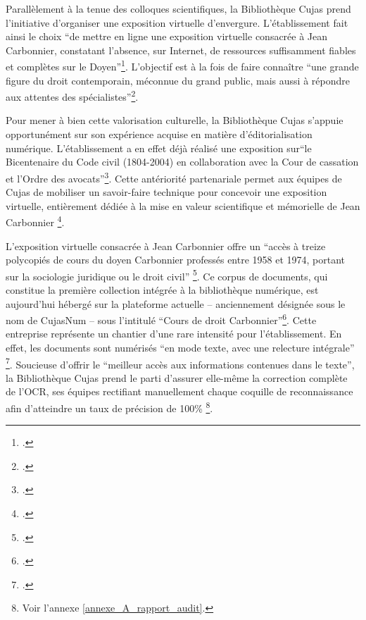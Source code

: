 Parallèlement à la tenue des colloques scientifiques, la Bibliothèque Cujas prend l'initiative d'organiser une exposition virtuelle d'envergure. L'établissement fait ainsi le choix \enquote{de mettre en ligne une exposition virtuelle consacrée à Jean Carbonnier, constatant l'absence, sur Internet, de ressources suffisamment fiables et complètes sur le Doyen}\footcite{balley4ExempleMediation2012}. L'objectif est à la fois de faire connaître \enquote{une grande figure du droit contemporain, méconnue du grand public, mais aussi à répondre aux attentes des spécialistes}\footcite{balley4ExempleMediation2012}. 

Pour mener à bien cette valorisation culturelle, la Bibliothèque Cujas s'appuie opportunément sur son expérience acquise en matière d'éditorialisation numérique. L'établissement a en effet déjà réalisé une exposition sur\enquote{le Bicentenaire du Code civil (1804-2004) en collaboration avec la Cour de cassation et l'Ordre des avocats}\footcite{balley4ExempleMediation2012}. Cette antériorité partenariale permet aux équipes de Cujas de mobiliser un savoir-faire technique pour concevoir une exposition virtuelle, entièrement dédiée à la mise en valeur scientifique et mémorielle de Jean Carbonnier \footcite{2007RefonteProgramme}.

L'exposition virtuelle consacrée à Jean Carbonnier offre un \enquote{accès à treize polycopiés de cours du doyen Carbonnier professés entre 1958 et 1974, portant sur la sociologie juridique ou le droit civil} \footcite{balley4ExempleMediation2012}. Ce corpus de documents, qui constitue la première collection intégrée à la bibliothèque numérique, est aujourd'hui hébergé sur la plateforme actuelle -- anciennement désignée sous le nom de CujasNum -- sous l'intitulé \enquote{Cours de droit Carbonnier}\footcite{SciencesJuridiqueslesSciences}. Cette entreprise représente un chantier d'une rare intensité pour l'établissement. En effet, les documents sont numérisés \enquote{en mode texte, avec une relecture intégrale} \footcite{balley4ExempleMediation2012}. Soucieuse d'offrir le \enquote{meilleur accès aux informations contenues dans le texte}, la Bibliothèque Cujas prend le parti d'assurer elle-même la correction complète de l'\ac{OCR}, ses équipes rectifiant manuellement  chaque coquille de reconnaissance afin d'atteindre un taux de précision de 100\% \footnote{Voir l'annexe \ref{annexe_A_rapport_audit}.}. 

